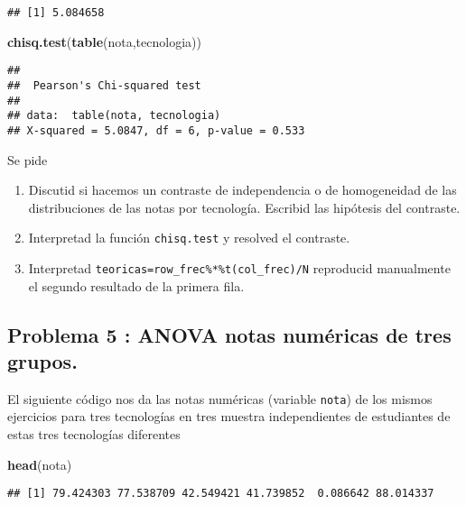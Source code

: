 \documentclass[
]{article}
\newenvironment{Shaded}{\begin{snugshade}}{\end{snugshade}}
\newcommand{\KeywordTok}[1]{\textcolor[rgb]{0.13,0.29,0.53}{\textbf{#1}}}
\newcommand{\NormalTok}[1]{#1}
\providecommand{\tightlist}{%
  \setlength{\itemsep}{0pt}\setlength{\parskip}{0pt}}
\begin{document}
\begin{verbatim}
## [1] 5.084658
\end{verbatim}

\begin{Shaded}
\begin{Highlighting}[]
\KeywordTok{chisq.test}\NormalTok{(}\KeywordTok{table}\NormalTok{(nota,tecnologia))}
\end{Highlighting}
\end{Shaded}

\begin{verbatim}
## 
##  Pearson's Chi-squared test
## 
## data:  table(nota, tecnologia)
## X-squared = 5.0847, df = 6, p-value = 0.533
\end{verbatim}

Se pide

\begin{enumerate}
\def\labelenumi{\arabic{enumi}.}
\tightlist
\item
  Discutid si hacemos un contraste de independencia o de homogeneidad de
  las distribuciones de las notas por tecnología. Escribid las hipótesis
  del contraste.
\item
  Interpretad la función \texttt{chisq.test} y resolved el contraste.
\item
  Interpretad \texttt{teoricas=row\_frec\%*\%t(col\_frec)/N} reproducid
  manualmente el segundo resultado de la primera fila.
\end{enumerate}

\hypertarget{problema-5-anova-notas-numuxe9ricas-de-tres-grupos.}{%
\subsection{Problema 5 : ANOVA notas numéricas de tres
grupos.}\label{problema-5-anova-notas-numuxe9ricas-de-tres-grupos.}}

El siguiente código nos da las notas numéricas (variable \texttt{nota})
de los mismos ejercicios para tres tecnologías en tres muestra
independientes de estudiantes de estas tres tecnologías diferentes

\begin{Shaded}
\begin{Highlighting}[]
\KeywordTok{head}\NormalTok{(nota)}
\end{Highlighting}
\end{Shaded}

\begin{verbatim}
## [1] 79.424303 77.538709 42.549421 41.739852  0.086642 88.014337
\end{verbatim}
\end{document}
